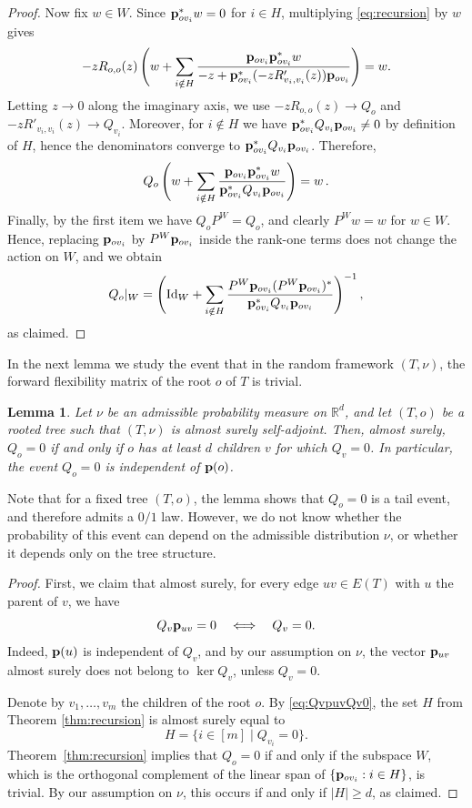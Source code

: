 \documentclass[10pt,a4paper]{amsart}
\numberwithin{equation}{section}
\newtheorem{lemma}[theorem]{Lemma}
\newcommand{\R}{\mathbb R}
\newcommand{\p}{{\bf p}}
\newcommand{\Id}{\mathrm{Id}}
\begin{document}
\begin{proof}
Now fix $w\in W$. Since $\p_{ov_i}^*w=0$ for $i\in H$, multiplying \eqref{eq:recursion} by $w$ gives
\[
-zR_{o,o}(z)\left(
w+\sum_{i\notin H}\frac{\p_{ov_i}\p_{ov_i}^*w}{-z+\p_{ov_i}^*(-zR'_{v_i,v_i}(z))\p_{ov_i}}
\right)=w.
\]
Letting $z\to 0$ along the imaginary axis, we use $-zR_{o,o}(z)\to Q_o$ and $-zR'_{v_i,v_i}(z)\to Q_{v_i}$.
Moreover, for $i\notin H$ we have $\p_{ov_i}^*Q_{v_i}\p_{ov_i}\neq 0$ by definition of $H$, hence the denominators converge to
$\p_{ov_i}^*Q_{v_i}\p_{ov_i}$. Therefore,
\[
Q_o\left(
w+\sum_{i\notin H}\frac{\p_{ov_i}\p_{ov_i}^*w}{\p_{ov_i}^*Q_{v_i}\p_{ov_i}}
\right)=w\,.
\]
Finally, by the first item we have $Q_oP^W=Q_o$, and clearly $P^Ww=w$ for $w\in W$. Hence, replacing $\p_{ov_i}$ by $P^W\p_{ov_i}$ inside the
rank-one terms does not change the action on $W$, and we obtain
\[
Q_o|_W=
\left(
\Id_W+\sum_{i\notin H}\frac{P^W\p_{ov_i}(P^W\p_{ov_i})^*}{\p_{ov_i}^*Q_{v_i}\p_{ov_i}}
\right)^{-1},
\]
as claimed.
\end{proof}


In the next lemma we study the event that in the random framework $(T,\nu)$, the forward flexibility matrix of the root $o$ of $T$ is trivial.

\begin{lemma}\label{lem:Qo0}
    Let $\nu$ be an admissible probability measure on $\R^d$, and let $(T,o)$ be a rooted tree such that $(T,\nu)$ is almost surely self-adjoint. 
    Then, almost surely, $Q_o=0$ if and only if $o$ has at least $d$ children $v$ for which $Q_v=0$. 
    In particular, the event $Q_o=0$ is independent of $\p(o)$.
\end{lemma}
Note that for a fixed tree \((T,o)\), the lemma shows that \(Q_o=0\) is a tail event, and therefore admits a \(0/1\) law.
However, we do not know whether the probability of this event can depend on the admissible distribution \(\nu\), or whether it depends only on the tree structure.

\begin{proof}
First, we claim that almost surely, for every edge $uv\in E(T)$ with $u$ the parent of $v$, we have
\begin{equation}\label{eq:QvpuvQv0}
Q_v\p_{uv}=0 \quad\Longleftrightarrow\quad Q_v=0.    
\end{equation}
Indeed, $\p(u)$ is independent of $Q_v$, and by our assumption on $\nu$, the vector $\p_{uv}$ almost surely does not belong to $\ker Q_v$, unless $Q_v=0$.

Denote by $v_1,\ldots,v_m$ the children of the root $o$. By \eqref{eq:QvpuvQv0}, the set $H$ from Theorem \ref{thm:recursion} is almost surely equal to
\begin{equation}\label{eq:H}
H=\{i\in[m]\mid Q_{v_i}=0\}.
\end{equation}
Theorem~\ref{thm:recursion} implies that $Q_o=0$ if and only if the subspace $W$, which is the orthogonal complement of the linear span of $\{\p_{ov_i}: i\in H\}$, is trivial.
By our assumption on $\nu$, this occurs if and only if $|H|\ge d$, as claimed.
\end{proof}
\end{document}
